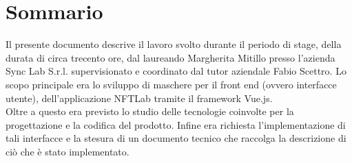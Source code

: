 
\cleardoublepage
{}
{}
\begingroup
\let\clearpage\relax
\let\cleardoublepage\relax
\let\cleardoublepage\relax

\chapter*{Sommario}

Il presente documento descrive il lavoro svolto durante il periodo di stage, della durata di circa trecento ore, dal laureando Margherita Mitillo presso l'azienda Sync Lab S.r.l. supervisionato e coordinato dal tutor aziendale Fabio Scettro.
Lo scopo principale era lo sviluppo di maschere per il front end (ovvero interfacce utente), dell'applicazione NFTLab tramite il framework Vue.js.\\
Oltre a questo era previsto lo studio delle tecnologie coinvolte per la progettazione e la codifica del prodotto.
Infine era richiesta l'implementazione di tali interfacce e la stesura di un documento tecnico che raccolga la descrizione di ciò che è stato implementato.

%
%

\endgroup			

\vfill

